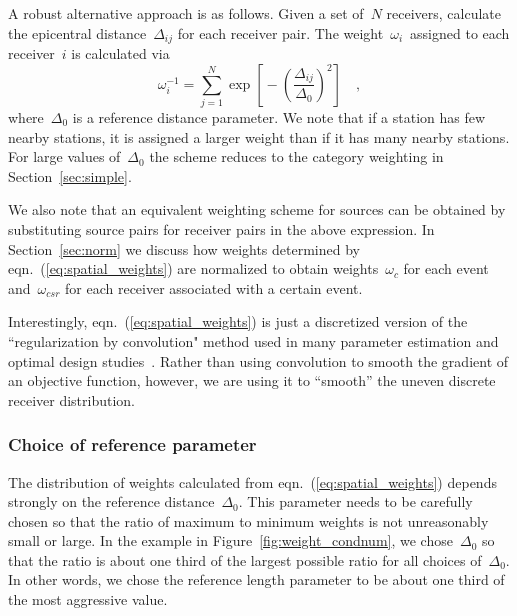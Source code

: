A robust alternative approach is as follows.  Given a set of~$N$ receivers, 
calculate the epicentral distance~$\Delta_{ij}$ for each receiver pair. 
The weight~$\omega_i$\, assigned to each receiver~$i$ is calculated via
\begin{equation}
\omega_{i}^{-1} = \sum_{j=1}^N \exp \left[\mbox{}- \left(\frac{\Delta_{ij}}{\Delta_0}\right)^2\right]
\quad ,
\label{eq:spatial_weights}
\end{equation}
where~$\Delta_{0}$ is a reference distance parameter.
We note that if a station has few nearby stations, it is assigned a larger weight than if it has many nearby 
stations.
For large values of~$\Delta_0$ the scheme reduces to the category weighting in Section~\ref{sec:simple}.

We also note that an equivalent weighting scheme for sources can be obtained by substituting source pairs for receiver pairs in the above expression.
In Section~\ref{sec:norm} we discuss how  weights determined by eqn.~(\ref{eq:spatial_weights}) are normalized to obtain weights~$\omega_{c}$ for each event and~$\omega_{csr}$ for each receiver associated with a certain event.

Interestingly, eqn.~(\ref{eq:spatial_weights}) is just a discretized version of the 
``regularization by convolution" method used in many parameter estimation and optimal 
design studies~\cite{Modrak2016}. Rather than using convolution to smooth the gradient 
of an objective function, however, we are using it to ``smooth'' the uneven discrete receiver 
distribution. 

\subsubsection{Choice of reference parameter}
\label{sec:ref-par}

The distribution of weights calculated from eqn.~(\ref{eq:spatial_weights}) depends strongly on the reference distance~$\Delta_0$.  This parameter needs to be carefully chosen so that the ratio of maximum to minimum  weights is not unreasonably small or large. 
In the example in Figure~\ref{fig:weight_condnum}, we chose~$\Delta_0$ so that the ratio is about one third of the largest possible ratio for all choices of~$\Delta_0$.  In other words, we chose the reference length parameter to be about one third of the most aggressive value.

